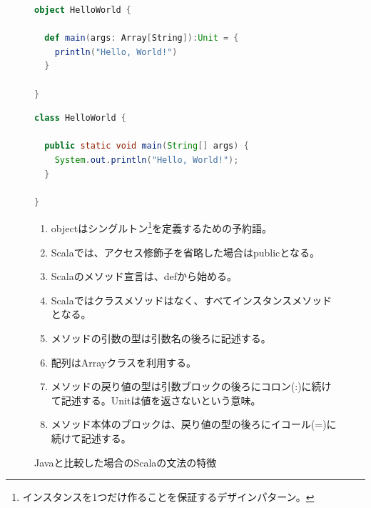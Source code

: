 \begin{figure}[h]
  \caption{Javaと比較した場合のScalaの文法の特徴}
  \label{fig:java_vs_scala_helloworld}

\begin{minipage}[t]{0.5\textwidth}
\begin{lstlisting}[language=scala, frame=none]
object HelloWorld {

  def main(args: Array[String]):Unit = {
    println("Hello, World!")
  }

}
\end{lstlisting}%
\end{minipage}%
\hfill
\begin{minipage}[t]{0.5\textwidth}
\begin{lstlisting}[language=java, frame=none]
class HelloWorld {

  public static void main(String[] args) {
    System.out.println("Hello, World!");
  }

}
\end{lstlisting}%
\end{minipage}%

\begin{screen}
\begin{enumerate}
\item objectはシングルトン\footnote{インスタンスを1つだけ作ることを保証するデザインパターン。}を定義するための予約語。
\item Scalaでは、アクセス修飾子を省略した場合はpublicとなる。
\item Scalaのメソッド宣言は、defから始める。
\item Scalaではクラスメソッドはなく、すべてインスタンスメソッドとなる。
\item メソッドの引数の型は引数名の後ろに記述する。
\item 配列はArrayクラスを利用する。
\item メソッドの戻り値の型は引数ブロックの後ろにコロン(:)に続けて記述する。Unitは値を返さないという意味。
\item メソッド本体のブロックは、戻り値の型の後ろにイコール(=)に続けて記述する。
\end{enumerate}
\end{screen}

\end{figure}
